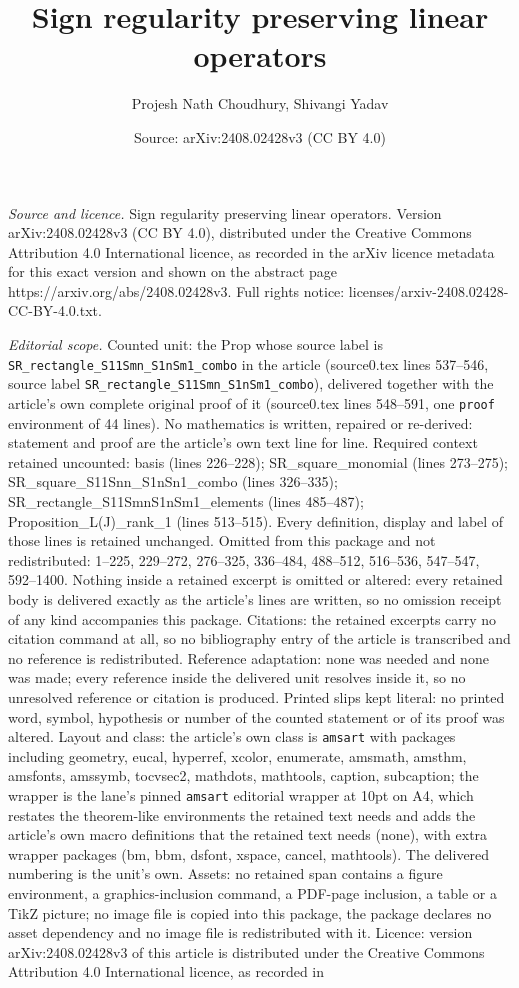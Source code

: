 \documentclass[10pt,a4paper]{amsart}
\title[Sign regularity preserving linear operators]{Sign regularity preserving linear operators}
\author{Projesh Nath Choudhury, Shivangi Yadav}
\date{Source: arXiv:2408.02428v3 (CC BY 4.0)}
\begin{document}
\maketitle

\noindent\emph{Source and licence.} Sign regularity preserving linear operators. Version arXiv:2408.02428v3 (CC BY 4.0), distributed under the Creative Commons Attribution 4.0 International licence, as recorded in the arXiv licence metadata for this exact version and shown on the abstract page https://arxiv.org/abs/2408.02428v3. Full rights notice: licenses/arxiv-2408.02428-CC-BY-4.0.txt.\par\smallskip

\noindent\textit{Editorial scope.} Counted unit: the Prop whose source label is \texttt{SR\_rectangle\_S11Smn\_S1nSm1\_combo} in the article (source0.tex lines 537--546, source label \texttt{SR\_rectangle\_S11Smn\_S1nSm1\_combo}), delivered together with the article's own complete original proof of it (source0.tex lines 548--591, one \texttt{proof} environment of 44 lines). No mathematics is written, repaired or re-derived: statement and proof are the article's own text line for line. Required context retained uncounted: basis (lines 226--228); SR\_square\_monomial (lines 273--275); SR\_square\_S11Snn\_S1nSn1\_combo (lines 326--335); SR\_rectangle\_S11SmnS1nSm1\_elements (lines 485--487); Proposition\_L(J)\_rank\_1 (lines 513--515). Every definition, display and label of those lines is retained unchanged. Omitted from this package and not redistributed: 1--225, 229--272, 276--325, 336--484, 488--512, 516--536, 547--547, 592--1400. Nothing inside a retained excerpt is omitted or altered: every retained body is delivered exactly as the article's lines are written, so no omission receipt of any kind accompanies this package. Citations: the retained excerpts carry no citation command at all, so no bibliography entry of the article is transcribed and no reference is redistributed. Reference adaptation: none was needed and none was made; every reference inside the delivered unit resolves inside it, so no unresolved reference or citation is produced. Printed slips kept literal: no printed word, symbol, hypothesis or number of the counted statement or of its proof was altered. Layout and class: the article's own class is \texttt{amsart} with packages including geometry, eucal, hyperref, xcolor, enumerate, amsmath, amsthm, amsfonts, amssymb, tocvsec2, mathdots, mathtools, caption, subcaption; the wrapper is the lane's pinned \texttt{amsart} editorial wrapper at 10pt on A4, which restates the theorem-like environments the retained text needs and adds the article's own macro definitions that the retained text needs (none), with extra wrapper packages (bm, bbm, dsfont, xspace, cancel, mathtools). The delivered numbering is the unit's own. Assets: no retained span contains a figure environment, a graphics-inclusion command, a PDF-page inclusion, a table or a TikZ picture; no image file is copied into this package, the package declares no asset dependency and no image file is redistributed with it. Licence: version arXiv:2408.02428v3 of this article is distributed under the Creative Commons Attribution 4.0 International licence, as recorded in 
\end{document}

